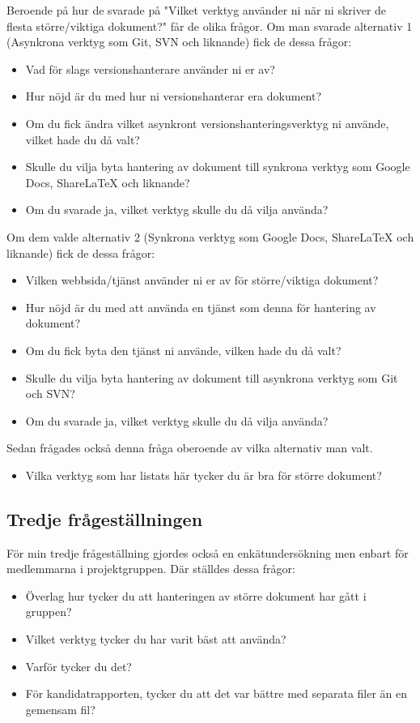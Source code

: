 Beroende på hur de svarade på "Vilket verktyg använder ni när ni skriver de flesta större/viktiga dokument?" får de olika frågor. Om man svarade alternativ 1 (Asynkrona verktyg som Git, SVN och liknande) fick de dessa frågor:

\begin{itemize}
	\item Vad för slags versionshanterare använder ni er av?
	\item Hur nöjd är du med hur ni versionshanterar era dokument?
	\item Om du fick ändra vilket asynkront versionshanteringsverktyg ni använde, vilket hade du då valt?
	\item Skulle du vilja byta hantering av dokument till synkrona verktyg som Google Docs, ShareLaTeX och liknande?
	\item Om du svarade ja, vilket verktyg skulle du då vilja använda?
\end{itemize}

Om dem valde alternativ 2 (Synkrona verktyg som Google Docs, ShareLaTeX och liknande) fick de dessa frågor:

\begin{itemize}
	\item Vilken webbsida/tjänst använder ni er av för större/viktiga dokument?
	\item Hur nöjd är du med att använda en tjänst som denna för hantering av dokument?
	\item Om du fick byta den tjänst ni använde, vilken hade du då valt?
	\item Skulle du vilja byta hantering av dokument till asynkrona verktyg som Git och SVN?
	\item Om du svarade ja, vilket verktyg skulle du då vilja använda?
\end{itemize}

Sedan frågades också denna fråga oberoende av vilka alternativ man valt.
\begin{itemize}
	\item Vilka verktyg som har listats här tycker du är bra för större dokument?
\end{itemize}

\subsection{Tredje frågeställningen}

För min tredje frågeställning gjordes också en enkätundersökning men enbart för medlemmarna i projektgruppen. Där ställdes dessa frågor:
\begin{itemize}
	\item Överlag hur tycker du att hanteringen av större dokument har gått i gruppen?
	\item Vilket verktyg tycker du har varit bäst att använda?
	\item Varför tycker du det?
	\item För kandidatrapporten, tycker du att det var bättre med separata filer än en gemensam fil?
\end{itemize}

